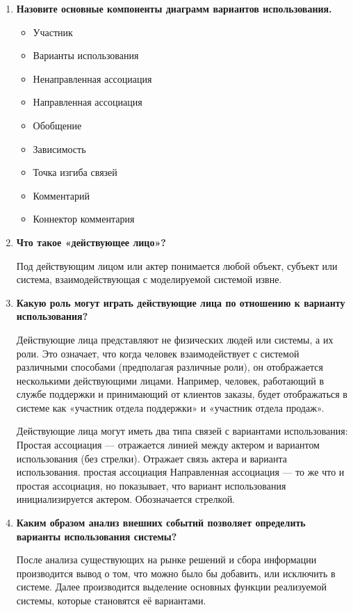 \begin{enumerate}
	\item \textbf{Назовите основные компоненты диаграмм вариантов
		использования.}\par
		\begin{itemize}
			\item Участник
			\item Варианты использования
			\item Ненаправленная ассоциация
			\item Направленная ассоциация
			\item Обобщение
			\item Зависимость
			\item Точка изгиба связей
			\item Комментарий
			\item Коннектор комментария
		\end{itemize}
	\item \textbf{Что такое «действующее лицо»?}\par
		Под действующим лицом или актер понимается любой объект,
		субъект или система, взаимодействующая с моделируемой системой извне.
	\item \textbf{Какую роль могут играть действующие лица по отношению
		к варианту использования?}\par
		Действующие лица представляют не физических людей или системы,
		а их роли. Это означает, что когда человек взаимодействует
		с системой различными способами (предполагая различные роли),
		он отображается несколькими действующими лицами.
		Например, человек, работающий в службе поддержки и принимающий
		от клиентов заказы, будет отображаться в системе как
		«участник отдела поддержки» и «участник отдела продаж».\par
		Действующие лица могут иметь два типа связей с вариантами
		использования: Простая ассоциация --- отражается линией между
		актером и вариантом использования (без стрелки).
		Отражает связь актера и варианта использования. простая ассоциация
		Направленная ассоциация --- то же что и простая ассоциация,
		но показывает, что вариант использования инициализируется актером.
		Обозначается стрелкой.
	\item \textbf{Каким образом анализ внешних событий позволяет определить
		варианты использования системы?}\par
		После анализа существующих на рынке решений и сбора информации
		производится вывод о том, что можно было бы добавить, или исключить
		в системе. Далее производится выделение основных функции реализуемой
		системы, которые становятся её вариантами.

\end{enumerate}
